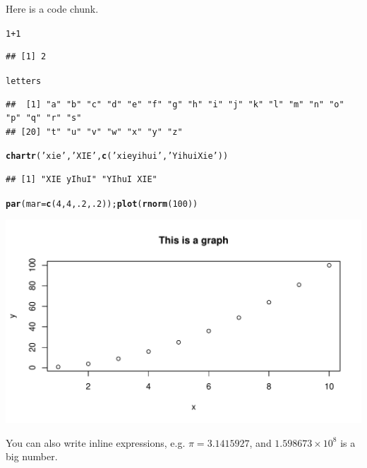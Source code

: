 \documentclass{article}\usepackage[]{graphicx}\usepackage[]{xcolor}
\makeatletter
\def\maxwidth{ %
  \ifdim\Gin@nat@width>\linewidth
    \linewidth
  \else
    \Gin@nat@width
  \fi
}
\newcommand{\hlnum}[1]{\textcolor[rgb]{0.686,0.059,0.569}{#1}}%
\newcommand{\hlstr}[1]{\textcolor[rgb]{0.192,0.494,0.8}{#1}}%
\newcommand{\hlopt}[1]{\textcolor[rgb]{0,0,0}{#1}}%
\newcommand{\hlstd}[1]{\textcolor[rgb]{0.345,0.345,0.345}{#1}}%
\newcommand{\hlkwc}[1]{\textcolor[rgb]{0.333,0.667,0.333}{#1}}%
\newcommand{\hlkwd}[1]{\textcolor[rgb]{0.737,0.353,0.396}{\textbf{#1}}}%
\newenvironment{kframe}{%
 \def\at@end@of@kframe{}%
 \ifinner\ifhmode%
  \def\at@end@of@kframe{\end{minipage}}%
  \begin{minipage}{\columnwidth}%
 \fi\fi%
 \def\FrameCommand##1{\hskip\@totalleftmargin \hskip-\fboxsep
 \colorbox{shadecolor}{##1}\hskip-\fboxsep
     \hskip-\linewidth \hskip-\@totalleftmargin \hskip\columnwidth}%
 \MakeFramed {\advance\hsize-\width
   \@totalleftmargin\z@ \linewidth\hsize
   \@setminipage}}%
 {\par\unskip\endMakeFramed%
 \at@end@of@kframe}
\newenvironment{knitrout}{}{} %
\makeatother
\begin{document}
Here is a code chunk.

\begin{knitrout}
\color{fgcolor}\begin{kframe}
\begin{alltt}
\hlnum{1}\hlopt{+}\hlnum{1}
\end{alltt}
\begin{verbatim}
## [1] 2
\end{verbatim}
\begin{alltt}
\hlstd{letters}
\end{alltt}
\begin{verbatim}
##  [1] "a" "b" "c" "d" "e" "f" "g" "h" "i" "j" "k" "l" "m" "n" "o" "p" "q" "r" "s"
## [20] "t" "u" "v" "w" "x" "y" "z"
\end{verbatim}
\begin{alltt}
\hlkwd{chartr}\hlstd{(}\hlstr{'xie'}\hlstd{,} \hlstr{'XIE'}\hlstd{,} \hlkwd{c}\hlstd{(}\hlstr{'xie yihui'}\hlstd{,} \hlstr{'Yihui Xie'}\hlstd{))}
\end{alltt}
\begin{verbatim}
## [1] "XIE yIhuI" "YIhuI XIE"
\end{verbatim}
\begin{alltt}
\hlkwd{par}\hlstd{(}\hlkwc{mar}\hlstd{=}\hlkwd{c}\hlstd{(}\hlnum{4}\hlstd{,} \hlnum{4}\hlstd{,} \hlnum{.2}\hlstd{,} \hlnum{.2}\hlstd{));} \hlkwd{plot}\hlstd{(}\hlkwd{rnorm}\hlstd{(}\hlnum{100}\hlstd{))}
\end{alltt}
\end{kframe}
\includegraphics[width=\maxwidth]{figure/foo-1} 
\end{knitrout}

You can also write inline expressions, e.g. $\pi=3.1415927$, and \ensuremath{1.598673\times 10^{8}} is a big number.
\end{document}
